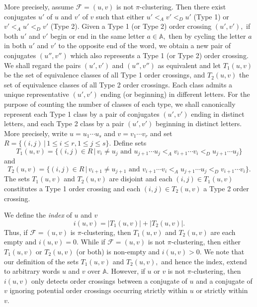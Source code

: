 \documentclass[12pt,a4paper]{amsart}
\newcommand{\A}{{\mathbb A}}
\begin{document}
More precisely, assume $\mathcal F=(u,v)$ is not $\pi$-clustering.  
Then there exist conjugates $u'$ of $u$ and $v'$ of $v$ such that either $u'<_A  v' <_D u'$ (Type 1) or $v'<_A u' <_D v'$ (Type 2). Given a Type 1 (or Type 2) order crossing $(u',v'),$ if both $u'$ and $v'$  begin or end in the same letter $a\in \A,$ then by cycling the letter $a$ in both $u'$ and $v'$ to the opposite end of the word, we obtain a new pair of conjugates $(u'',v'')$ which also represents a Type 1 (or Type 2) order crossing. We shall regard the pairs $(u',v')$ and $(u'',v'')$ as equivalent and let $T_1(u,v)$ be the set of equivalence classes of all Type 1 order crossings, and $T_2(u,v)$  the set of  equivalence classes of all Type 2 order crossings. Each class admits a unique representative $(u',v')$ ending (or beginning) in different letters. For the purpose of counting the number of classes of each type, we shall canonically represent each Type 1 class by a pair of conjugates $(u',v')$ ending in distinct letters, and each Type 2 class by a pair $(u',v')$ beginning in distinct letters. More precisely, write $u=u_1\cdots u_s$ and $v=v_1\cdots v_r$ and   set $R=\{(i,j)\,|\, 1\leq i\leq r, 1\leq j\leq s\}. $ Define sets
\begin{equation}\label{type1}T_1(u,v) =\{(i,j)\in R \, |\, v_i\neq u_j \,\,\mbox{and}\,\, u_{j+1}\cdots u_j<_A v_{i+1}\cdots v_i <_D u_{j+1}\cdots u_j\}\end{equation} and
\begin{equation}\label{type2}T_2(u,v) =\{(i,j)\in R  \,|\,  v_{i+1}\neq u_{j+1} \,\,\mbox{and}\,\, v_{i+1}\cdots v_i<_A u_{j+1}\cdots u_j <_D v_{i+1}\cdots v_i\}.\end{equation}
The sets $T_1(u,v)$ and $T_2(u,v)$ are disjoint and each $(i,j)\in T_1(u,v)$ constitutes a Type 1 order crossing  and each $(i,j)\in T_2(u,v)$ a Type 2 order crossing.



We define the {\it index} of $u$ and $v$ \[i(u,v) = |T_1(u,v)| + |T_2(u,v)|.\]
Thus,  if $\mathcal F=(u,v)$ is $\pi$-clustering, then $T_1(u,v)$ and $T_2(u,v)$ are each empty and $i(u,v)=0.$ 
While if $\mathcal F=(u,v)$ is not $\pi$-clustering, then either $T_1(u,v)$ or $T_2(u,v)$ (or both) is non-empty and $i(u,v)>0.$ 
We note that our definition of the sets $T_1(u,v)$ and $T_2(u,v),$ and hence the index, extend to arbitrary words $u$ and $v$ over $\A.$ However, if $u$ or $v$ is not $\pi$-clustering, then  $i(u,v)$ only detects order crossings between a conjugate of $u$ and a conjugate of $v$ ignoring potential order crossings occurring strictly within $u$ or strictly within $v.$ 
\end{document}
